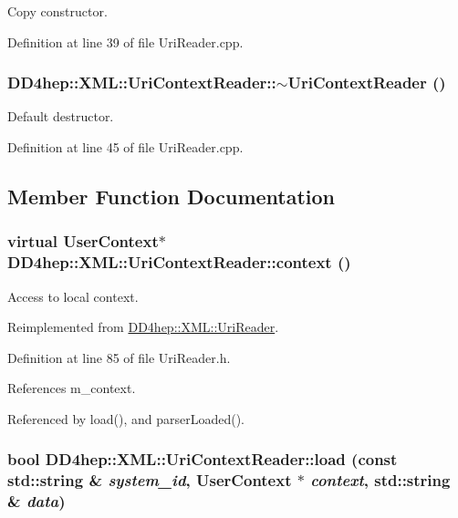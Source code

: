 Copy constructor. 

Definition at line 39 of file UriReader.cpp.\hypertarget{class_d_d4hep_1_1_x_m_l_1_1_uri_context_reader_a065124ec7d3af30801bf471ed4259690}{
\subsubsection[{$\sim$UriContextReader}]{\setlength{\rightskip}{0pt plus 5cm}DD4hep::XML::UriContextReader::$\sim$UriContextReader ()}}
\label{class_d_d4hep_1_1_x_m_l_1_1_uri_context_reader_a065124ec7d3af30801bf471ed4259690}


Default destructor. 

Definition at line 45 of file UriReader.cpp.

\subsection{Member Function Documentation}
\hypertarget{class_d_d4hep_1_1_x_m_l_1_1_uri_context_reader_ad7ba7d778fdc8df96cca1e298003a403}{
\subsubsection[{context}]{\setlength{\rightskip}{0pt plus 5cm}virtual {\bf UserContext}$\ast$ DD4hep::XML::UriContextReader::context ()}}
\label{class_d_d4hep_1_1_x_m_l_1_1_uri_context_reader_ad7ba7d778fdc8df96cca1e298003a403}


Access to local context. 

Reimplemented from \hyperlink{class_d_d4hep_1_1_x_m_l_1_1_uri_reader_a9f8d06469b3e5bf1e69c72c4285dfcac}{DD4hep::XML::UriReader}.

Definition at line 85 of file UriReader.h.

References m\_\-context.

Referenced by load(), and parserLoaded().\hypertarget{class_d_d4hep_1_1_x_m_l_1_1_uri_context_reader_a4a092a836c08154d7d787f9244701944}{
\subsubsection[{load}]{\setlength{\rightskip}{0pt plus 5cm}bool DD4hep::XML::UriContextReader::load (const std::string \& {\em system\_\-id}, \/  {\bf UserContext} $\ast$ {\em context}, \/  std::string \& {\em data})}}
\label{class_d_d4hep_1_1_x_m_l_1_1_uri_context_reader_a4a092a836c08154d7d787f9244701944}


